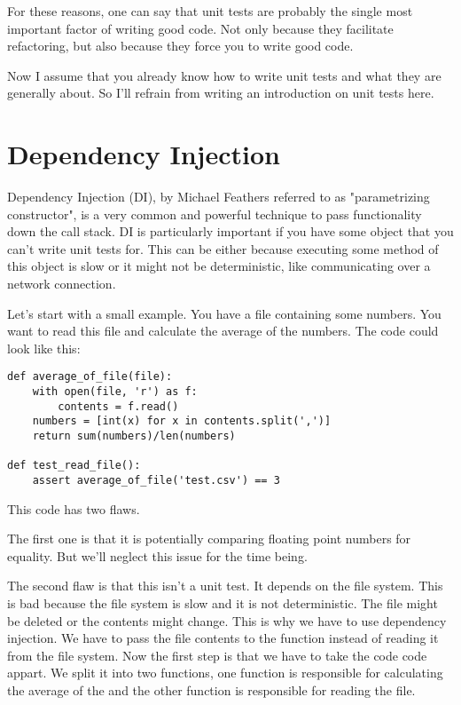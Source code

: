For these reasons, one can say that unit tests are probably the single most important factor of writing good code. Not only because they facilitate refactoring, but also because they force you to write good code.

Now I assume that you already know how to write unit tests and what they are generally about. So I'll refrain from writing an introduction on unit tests here. 

\section{Dependency Injection}\label{sec:dependency_injection}

Dependency Injection (DI), by Michael Feathers referred to as "parametrizing constructor", is a very common and powerful technique to pass functionality down the call stack. DI is particularly important if you have some object that you can't write unit tests for. This can be either because executing some method of this object is slow or it might not be deterministic, like communicating over a network connection.

Let's start with a small example. You have a file containing some numbers. You want to read this file and calculate the average of the numbers. The code could look like this:

\begin{programcode}{}\label{prog:average_of_file}
\begin{verbatim}
def average_of_file(file):
    with open(file, 'r') as f:
        contents = f.read()
    numbers = [int(x) for x in contents.split(',')]
    return sum(numbers)/len(numbers)

def test_read_file():
    assert average_of_file('test.csv') == 3
\end{verbatim} 
\end{programcode}

This code has two flaws. 

The first one is that it is potentially comparing floating point numbers for equality. But we'll neglect this issue for the time being.

The second flaw is that this isn't a unit test. It depends on the file system. This is bad because the file system is slow and it is not deterministic. The file might be deleted or the contents might change. This is why we have to use dependency injection. We have to pass the file contents to the function instead of reading it from the file system. Now the first step is that we have to take the code code appart. We split it into two functions, one function is responsible for calculating the average of the  and the other function is responsible for reading the file.

